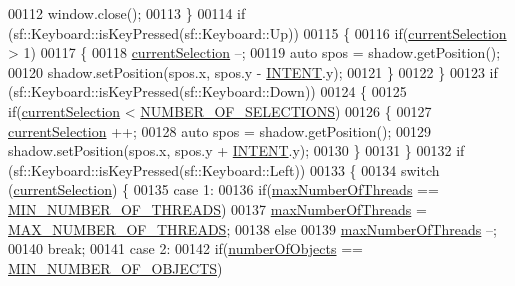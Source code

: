 \begin{DoxyCode}
00112                 window.close();
00113             \}
00114             \textcolor{keywordflow}{if} (sf::Keyboard::isKeyPressed(sf::Keyboard::Up))
00115             \{
00116                 \textcolor{keywordflow}{if}(\hyperlink{main_8cpp_a0e589f9054cc1ee0716a7ecda74b1352}{currentSelection} > 1)
00117                 \{
00118                     \hyperlink{main_8cpp_a0e589f9054cc1ee0716a7ecda74b1352}{currentSelection} --;
00119                     \textcolor{keyword}{auto} spos = shadow.getPosition();
00120                     shadow.setPosition(spos.x, spos.y - \hyperlink{main_8cpp_a14d85091e46f0926119718516c204b46}{INTENT}.y);
00121                 \}
00122             \}
00123             \textcolor{keywordflow}{if} (sf::Keyboard::isKeyPressed(sf::Keyboard::Down))
00124             \{
00125                 \textcolor{keywordflow}{if}(\hyperlink{main_8cpp_a0e589f9054cc1ee0716a7ecda74b1352}{currentSelection} < \hyperlink{main_8cpp_a436c13fbdbbdf82ab2c1b5e23a3928b2}{NUMBER\_OF\_SELECTIONS})
00126                 \{
00127                     \hyperlink{main_8cpp_a0e589f9054cc1ee0716a7ecda74b1352}{currentSelection} ++;
00128                     \textcolor{keyword}{auto} spos = shadow.getPosition();
00129                     shadow.setPosition(spos.x, spos.y + \hyperlink{main_8cpp_a14d85091e46f0926119718516c204b46}{INTENT}.y);
00130                 \}
00131             \}
00132             \textcolor{keywordflow}{if} (sf::Keyboard::isKeyPressed(sf::Keyboard::Left))
00133             \{
00134                 \textcolor{keywordflow}{switch} (\hyperlink{main_8cpp_a0e589f9054cc1ee0716a7ecda74b1352}{currentSelection}) \{
00135                     \textcolor{keywordflow}{case} 1:
00136                         \textcolor{keywordflow}{if}(\hyperlink{main_8cpp_a4639134a7fa7033334111ff9d77316f3}{maxNumberOfThreads} == 
      \hyperlink{main_8cpp_a7f46011598890ac8e7b3d6290df2e011}{MIN\_NUMBER\_OF\_THREADS})
00137                             \hyperlink{main_8cpp_a4639134a7fa7033334111ff9d77316f3}{maxNumberOfThreads} = 
      \hyperlink{main_8cpp_ad903c6d94e1d79d2c7103b7eeebbff25}{MAX\_NUMBER\_OF\_THREADS};
00138                         \textcolor{keywordflow}{else}
00139                             \hyperlink{main_8cpp_a4639134a7fa7033334111ff9d77316f3}{maxNumberOfThreads} --;
00140                         \textcolor{keywordflow}{break};
00141                     \textcolor{keywordflow}{case} 2:
00142                         \textcolor{keywordflow}{if}(\hyperlink{main_8cpp_a2303e0afaea24a80ed690de888548862}{numberOfObjects} == 
      \hyperlink{main_8cpp_a33029f68c1cf4a3c7c90cfb59edee648}{MIN\_NUMBER\_OF\_OBJECTS})

\end{DoxyCode}
